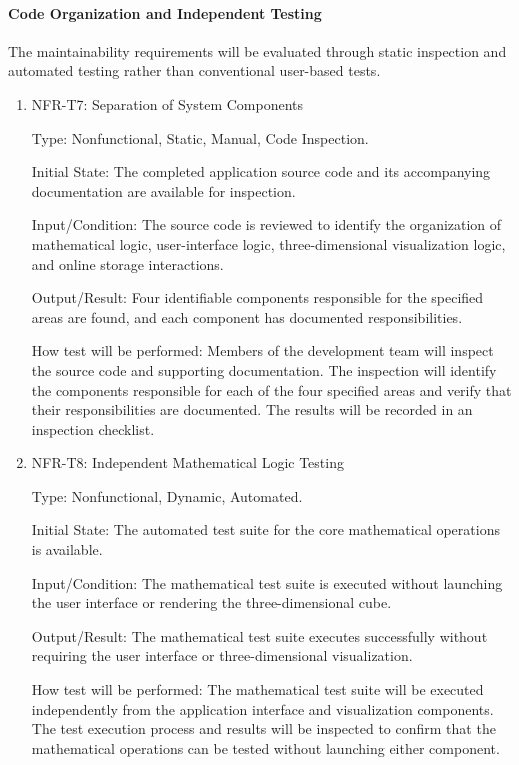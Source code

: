 \documentclass[12pt, titlepage]{article}
\begin{document}
\paragraph{Code Organization and Independent Testing}

The maintainability requirements will be evaluated through static
inspection and automated testing rather than conventional user-based
tests.

\begin{enumerate}

\item{NFR-T7: Separation of System Components\\}

Type: Nonfunctional, Static, Manual, Code Inspection.

Initial State: The completed application source code and its
accompanying documentation are available for inspection.

Input/Condition: The source code is reviewed to identify the organization
of mathematical logic, user-interface logic, three-dimensional
visualization logic, and online storage interactions.

Output/Result: Four identifiable components responsible for the
specified areas are found, and each component has documented
responsibilities.

How test will be performed: Members of the development team will
inspect the source code and supporting documentation. The inspection
will identify the components responsible for each of the four specified
areas and verify that their responsibilities are documented.
The results will be recorded in an inspection checklist.

\item{NFR-T8: Independent Mathematical Logic Testing\\}

Type: Nonfunctional, Dynamic, Automated.

Initial State: The automated test suite for the core mathematical
operations is available.

Input/Condition: The mathematical test suite is executed without
launching the user interface or rendering the three-dimensional cube.

Output/Result: The mathematical test suite executes successfully
without requiring the user interface or three-dimensional visualization.

How test will be performed: The mathematical test suite will be
executed independently from the application interface and visualization
components. The test execution process and results will be inspected
to confirm that the mathematical operations can be tested without
launching either component.

\end{enumerate}
\end{document}
